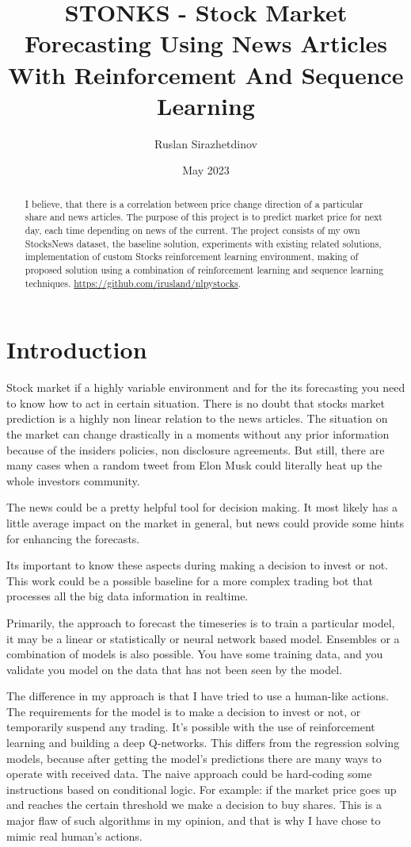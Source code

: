 \documentclass{article}
\title{STONKS - Stock Market Forecasting Using News Articles With Reinforcement And Sequence Learning}
\author{Ruslan Sirazhetdinov}
\date{May 2023}
\begin{document}
\maketitle
\begin{abstract}
    I believe, that there is a correlation between price change direction of a particular share and news articles. The purpose of this project is to predict market price for next day, each time depending on news of the current. The project consists of my own StocksNews dataset, the baseline solution, experiments with existing related solutions, implementation of custom Stocks reinforcement learning environment, making of proposed solution using a combination of reinforcement learning and sequence learning techniques.
    \url{https://github.com/irusland/nlpystocks}.
\end{abstract}



\section{Introduction}
Stock market if a highly variable environment and for the its forecasting you need to know how to act in certain situation. 
There is no doubt that stocks market prediction is a highly non linear relation to the news articles. The situation on the market can change drastically in a moments without any prior information because of the insiders policies, non disclosure agreements. But still, there are many cases when a random tweet from Elon Musk could literally heat up the whole investors community.

The news could be a pretty helpful tool for decision making. 
It most likely has a little average impact on the market in general, but news could provide some hints for enhancing the forecasts.

Its important to know these aspects during making a decision to invest or not. This work could be a possible baseline for a more complex trading bot that processes all the big data information in realtime.

Primarily, the approach to forecast the timeseries is to train a particular model, it may be a linear or statistically or neural network based model. Ensembles or a combination of models is also possible. You have some training data, and you validate you model on the data that has not been seen by the model. 

The difference in my approach is that I have tried to use a human-like actions.
The requirements for the model is to make a decision to invest or not, or temporarily suspend any trading.
It's possible with the use of reinforcement learning and building a deep Q-networks.
This differs from the regression solving models, because after getting the model's predictions there are many ways to operate with received data. The naive approach could be hard-coding some instructions based on conditional logic. For example: if the market price goes up and reaches the certain threshold we make a decision to buy shares. 
This is a major flaw of such algorithms in my opinion, and that is why I have chose to mimic real human's actions.
\end{document}
